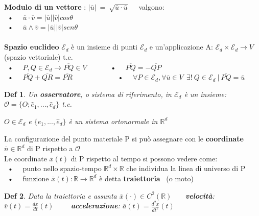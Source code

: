 \documentclass{article}
\theoremstyle{unnumbered}
\newtheorem* {theoremT}{Def}
\theoremstyle{unnumbered1}
\newenvironment{defi}{\begin{gBox}\begin{theoremT}}{\end{theoremT}\end{gBox}}
\begin{document}
%
%
%
\textbf{Modulo di un vettore} : $|\overline{u}| \ = \ \sqrt{\overline{u}\cdot\overline{u}} $ \ \ valgono: \\
\ • \ \ $\overline{u}\cdot\overline{v} = |\overline{u}||\overline{v}|cos\theta $ \\
\ • \ \ $\overline{u}\wedge\overline{v}=|\overline{u}||\overline{v}|sen\theta$ \\ \\
%
%
%
\textbf{Spazio euclideo} $\mathcal{E}_d$ è un insieme di punti $\mathcal{E}_d$ e un'applicazione A: $\mathcal{E}_d\times\mathcal{E}_d\rightarrow V$ (spazio vettoriale) t.c. \\
%
\ • \ \ $P,Q \in\mathcal{E}_d \rightarrow \overline{PQ}\in V$ \ \ \ \ \ \ • \ \ $\overline{PQ}=-\overline{QP}$ \\
\ • \ \ $\overline{PQ}+\overline{QR}=\overline{PR}$ \ \ \ \ \ \ \ \ \ \ \ \ • \ \ $\forall P \in \mathcal{E}_d, \forall \overline{u} \in V \ \ \exists! \ Q \in \mathcal{E}_d \ | \ \overline{PQ}=\overline{u}$ \\
%
%
%
\begin{defi}
Un \textbf{osservatore}, o sistema di riferimento, in $\mathcal{E}_d$ è un insieme: $\mathcal{O}= \{O; \hat{e}_1,...,\hat{e}_d \}$ t.c.

$O\in\mathcal{E}_d$ e $ \{\hat{e}_1,...,\hat{e}_d \} $ è un sistema ortonormale in $\mathbb{R}^d$
\end{defi}
%
La configurazione del punto materiale P si può assegnare con le \textbf{coordinate} $\overline{n} \in\mathbb{R}^d$ di P rispetto a $\mathcal{O}$ \\
Le coordinate $\overline{x}(t)$ di P rispetto al tempo si possono vedere come:\\
\ • \ \ punto nello spazio-tempo $\mathbb{R}^d\times\mathbb{R}$ che individua la linea di universo di P \\
\ • \ \ funzione $\overline{x}(t): \mathbb{R}\rightarrow\mathbb{R}^d$ è detta \textbf{traiettoria} \ (o moto) \\
%
\begin{defi}
Data la traiettoria e assunta $\overline{x}(\cdot) \in C^2(\mathbb{R})$ \ \ \ 
\textbf{velocità}: $\overline{v}(t) = \frac{d\overline{x}}{dt}(t)$ \ \ \ \ \textbf{accelerazione}: $\overline{a}(t) = \frac{d^2\overline{x}}{dt^2}(t)$
\end{defi}

\pagebreak %
\end{document}
